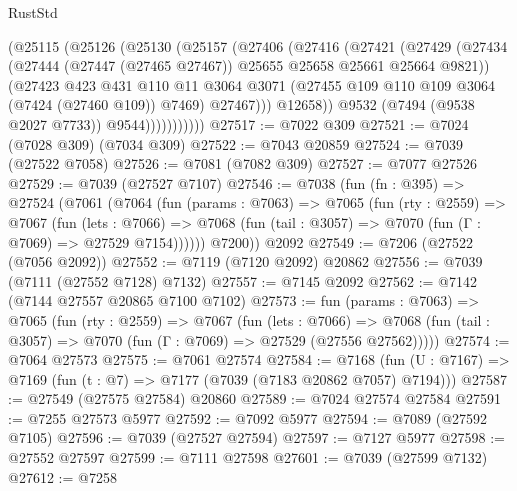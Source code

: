 \begin{lexlean}{RustStd}
\begin{coremodule}
                  (@25115
                    (@25126
                      (@25130
                        (@25157
                          (@27406
                            (@27416
                              (@27421
                                (@27429
                                  (@27434
                                    (@27444
                                      (@27447 (@27465 @27467))
                                      @25655
                                      @25658
                                      @25661
                                      @25664
                                      @9821))
                                  (@27423
                                    @423
                                    @431
                                    @110
                                    @11
                                    @3064
                                    @3071
                                    (@27455 @109 @110 @109 @3064 (@7424 (@27460 @109)) @7469)
                                    @27467)))
                              @12658))
                          @9532
                          (@7494 (@9538 @2027 @7733))
                          @9544)))))))))))
@27517 := @7022 @309
@27521 := @7024 (@7028 @309) (@7034 @309)
@27522 := @7043 @20859
@27524 := @7039 (@27522 @7058)
@27526 := @7081 (@7082 @309)
@27527 := @7077 @27526
@27529 := @7039 (@27527 @7107)
@27546 := @7038
    (fun (fn : @395) =>
    @27524
      (@7061
        (@7064
          (fun (params : @7063) =>
          @7065
            (fun (rty : @2559) =>
            @7067
              (fun (lets : @7066) =>
              @7068 (fun (tail : @3057) => @7070 (fun (Γ : @7069) => @27529 @7154))))))
        @7200))
    @2092
@27549 := @7206 (@27522 (@7056 @2092))
@27552 := @7119 (@7120 @2092) @20862
@27556 := @7039 (@7111 (@27552 @7128) @7132)
@27557 := @7145 @2092
@27562 := @7142 (@7144 @27557 @20865 @7100 @7102)
@27573 := fun (params : @7063) =>
  @7065
    (fun (rty : @2559) =>
    @7067
      (fun (lets : @7066) =>
      @7068 (fun (tail : @3057) => @7070 (fun (Γ : @7069) => @27529 (@27556 @27562)))))
@27574 := @7064 @27573
@27575 := @7061 @27574
@27584 := @7168
    (fun (U : @7167) => @7169 (fun (t : @7) => @7177 (@7039 (@7183 @20862 @7057) @7194)))
@27587 := @27549 (@27575 @27584) @20860
@27589 := @7024 @27574 @27584
@27591 := @7255 @27573 @5977
@27592 := @7092 @5977
@27594 := @7089 (@27592 @7105)
@27596 := @7039 (@27527 @27594)
@27597 := @7127 @5977
@27598 := @27552 @27597
@27599 := @7111 @27598
@27601 := @7039 (@27599 @7132)
@27612 := @7258

\end{coremodule}
\end{lexlean}
